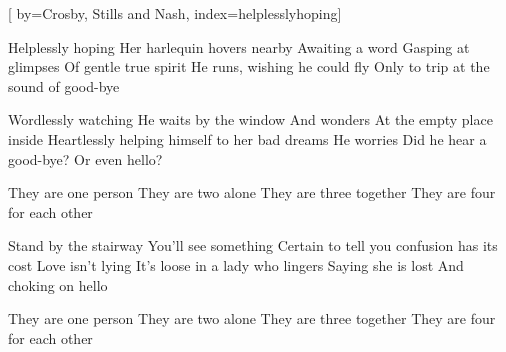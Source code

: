 
[%
    by={Crosby, Stills and Nash},
    index={helplesslyhoping}]


    \label{helplesslyhoping}

    \beginverse
        Helplessly hoping
        Her harlequin hovers nearby
        Awaiting a word
        Gasping at glimpses
        Of gentle true spirit
        He runs, wishing he could fly
        Only to trip at the sound of good-bye
    \endverse

    \beginverse
        Wordlessly watching
        He waits by the window
        And wonders
        At the empty place inside
        Heartlessly helping himself to her bad dreams
        He worries
        Did he hear a good-bye? Or even hello?
    \endverse

    \beginchorus
        They are one person
        They are two alone
        They are three together
        They are four for each other
    \endchorus

    \beginverse
        Stand by the stairway
        You'll see something
        Certain to tell you confusion has its cost
        Love isn't lying
        It's loose in a lady who lingers
        Saying she is lost
        And choking on hello
    \endverse

    \beginchorus
        They are one person
        They are two alone
        They are three together
        They are four for each other
    \endchorus
\endsong
